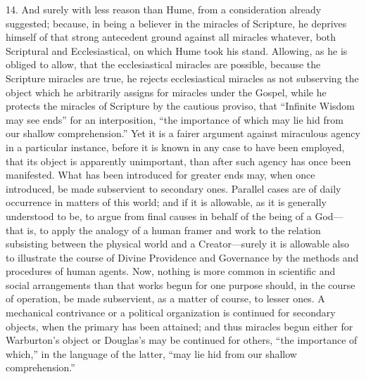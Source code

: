 14.
And surely with less reason than Hume, from a consideration already
suggested; because, in being a believer in the miracles of Scripture,
he deprives himself of that strong antecedent ground against all
miracles whatever, both Scriptural and Ecclesiastical, on which Hume
took his stand. Allowing, as he is obliged to allow, that the
ecclesiastical miracles are possible, because the Scripture
miracles are true, he rejects ecclesiastical miracles as not
subserving the object which he arbitrarily assigns for miracles under
the Gospel, while he protects the miracles of Scripture by the
cautious proviso, that ``Infinite Wisdom may see ends'' for an
interposition, ``the importance of which may lie hid from our shallow
comprehension.'' Yet it is a fairer argument against miraculous
agency in a particular instance, before it is known in any case to
have been employed, that its object is apparently unimportant, than
after such agency has once been manifested. What has been introduced
for greater ends may, when once introduced, be made subservient to
secondary ones. Parallel cases are of daily occurrence in matters of
this world; and if it is allowable, as it is generally understood to
be, to argue from final causes in behalf of the being of a God—that
is, to apply the analogy of a human framer and work to the relation
subsisting between the physical world and a Creator—surely it is
allowable also to illustrate the course of Divine Providence and
Governance by the methods and procedures of human agents. Now, nothing
is more common in scientific and social arrangements than that works
begun for one purpose should, in the course of operation, be made
subservient, as a matter of course, to lesser ones. A mechanical
contrivance or a political organization is continued for secondary
objects, when the primary has been attained; and thus miracles
begun either for Warburton's object or Douglas's may be continued
for others, ``the importance of which,'' in the language of the
latter, ``may lie hid from our shallow comprehension.''


